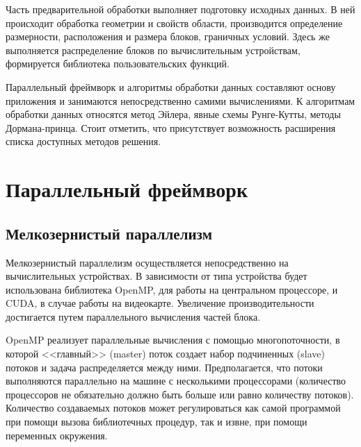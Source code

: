 \documentclass[a4paper, 14pt]{article}
\theoremstyle{definition}
\begin{document}
\par Часть предварительной обработки выполняет подготовку исходных данных. В ней происходит обработка геометрии и свойств области, производится определение размерности, расположения и размера блоков, граничных условий. Здесь же выполняется распределение блоков по вычислительным устройствам, формируется библиотека пользовательских функций.

\par Параллельный фреймворк и алгоритмы обработки данных составляют основу приложения и занимаются непосредственно самими вычислениями. К алгоритмам обработки данных относятся метод Эйлера, явные схемы Рунге-Кутты, методы Дормана-принца. Стоит отметить, что присутствует возможность расширения списка доступных методов решения.

\newpage
\section{Параллельный фреймворк}


\subsection{Мелкозернистый параллелизм}

\par Мелкозернистый параллелизм осуществляется непосредственно на вычислительных устройствах. В зависимости от типа устройства будет использована библиотека OpenMP, для работы на центральном процессоре, и CUDA, в случае работы на видеокарте. Увеличение производительности достигается путем параллельного вычисления частей блока.

\par OpenMP реализует параллельные вычисления с помощью многопоточности, в которой <<главный>> (master) поток создает набор подчиненных (slave) потоков и задача распределяется между ними. Предполагается, что потоки выполняются параллельно на машине с несколькими процессорами (количество процессоров не обязательно должно быть больше или равно количеству потоков). Количество создаваемых потоков может регулироваться как самой программой при помощи вызова библиотечных процедур, так и извне, при помощи переменных окружения.
\end{document}
